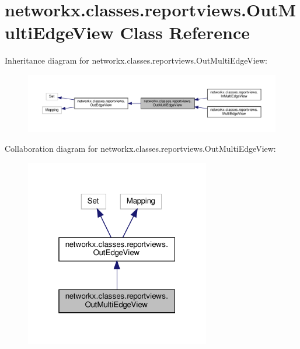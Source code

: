 \hypertarget{classnetworkx_1_1classes_1_1reportviews_1_1OutMultiEdgeView}{}\section{networkx.\+classes.\+reportviews.\+Out\+Multi\+Edge\+View Class Reference}
\label{classnetworkx_1_1classes_1_1reportviews_1_1OutMultiEdgeView}


Inheritance diagram for networkx.\+classes.\+reportviews.\+Out\+Multi\+Edge\+View\+:
\nopagebreak
\begin{figure}[H]
\begin{center}
\leavevmode
\includegraphics[width=350pt]{classnetworkx_1_1classes_1_1reportviews_1_1OutMultiEdgeView__inherit__graph}
\end{center}
\end{figure}


Collaboration diagram for networkx.\+classes.\+reportviews.\+Out\+Multi\+Edge\+View\+:
\nopagebreak
\begin{figure}[H]
\begin{center}
\leavevmode
\includegraphics[width=229pt]{classnetworkx_1_1classes_1_1reportviews_1_1OutMultiEdgeView__coll__graph}
\end{center}
\end{figure}
